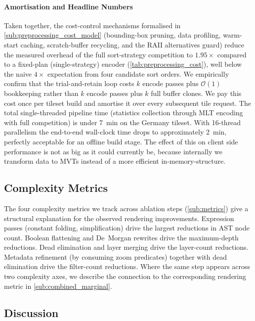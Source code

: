\paragraph{Amortisation and Headline Numbers}
Taken together, the cost-control mechanisms formalised in \cref{sub:preprocessing_cost_model} (bounding-box pruning, data profiling, warm-start caching, scratch-buffer recycling, and the \ac{RAII} alternatives guard) reduce the measured overhead of the full sort-strategy competition to $1.95\times$ compared to a fixed-plan (single-strategy) encoder (\cref{tab:preprocessing_cost}), well below the naive $4\times$ expectation from four candidate sort orders.
We empirically confirm that the trial-and-retain loop costs $k$ encode passes plus $\mathcal{O}(1)$ bookkeeping rather than $k$ encode passes plus $k$ full buffer clones.
We pay this cost once per tileset build and amortise it over every subsequent tile request.
The total single-threaded pipeline time (statistics collection through \ac{MLT} encoding with full competition) is under \qty{7}{\minute} on the Germany tileset.
With 16-thread parallelism the end-to-end wall-clock time drops to approximately \qty{2}{\minute}, perfectly acceptable for an offline build stage.
The effect of this on client side performance is not as big as it could currently be, because internally we transform data to \acsp{MVT} instead of a more efficient in-memory-structure.

\subsection{Complexity Metrics}\label{sub:combined_complexity}

The four complexity metrics we track across ablation steps (\cref{sub:metrics}) give a structural explanation for the observed rendering improvements.
Expression passes (constant folding, simplification) drive the largest reductions in \ac{AST} node count.
Boolean flattening and De~Morgan rewrites drive the maximum-depth reductions.
Dead elimination and layer merging drive the layer-count reductions.
Metadata refinement (by consuming zoom predicates) together with dead elimination drive the filter-count reductions.
Where the same step appears across two complexity axes, we describe the connection to the corresponding rendering metric in \cref{sub:combined_marginal}.

\subsection{Discussion}\label{sub:combined_discussion}

